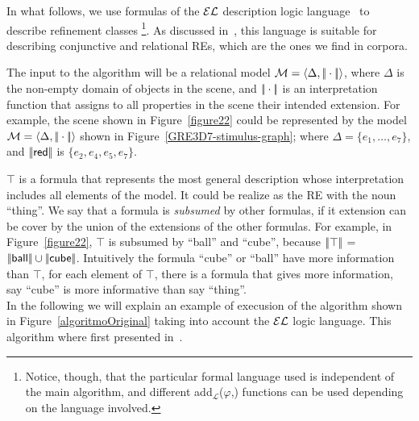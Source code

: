 
In what follows, we use formulas of the $\mathcal{EL}$ description logic
language~\cite{baad:desc03} to describe refinement classes
\footnote{Notice, though, that the particular formal language used is
  independent of the main algorithm, and different
  add$_{\mathcal{L}}$($\varphi$,\RE) functions can be used depending
  on the language involved.}.  As discussed
in~\cite{arec2:2008:Areces}, this language is suitable for describing
conjunctive and relational REs, which are the ones we find in corpora.

 The input to the algorithm will be a relational model $\mathcal{M} =
 \langle \Delta, |\!|\cdot|\!| \rangle$, where $\Delta$ is the non-empty domain
 of objects in the scene, and $|\!|\cdot|\!|$ is an interpretation
 function that assigns to all properties in the scene their intended
 extension.  For example, the scene shown in Figure~\ref{figure22}
 could be represented by the model $\mathcal{M}=\langle \Delta,|\!|\cdot|\!| \rangle$
 shown in Figure~\ref{GRE3D7-stimulus-graph}; where $\Delta =
 \{e_1,\ldots,e_7\}$, and $|\!|\textsf{red}|\!|$ is $\{e_2, e_4, e_5,
 e_7\}$.

$\top$ is a formula that represents the most general description whose
interpretation includes all elements of the model. It could be realize
as the RE with the noun ``\textsf{thing}''. We say that a formula is
\emph{subsumed} by other formulas, if it extension can be cover by the
union of the extensions of the other formulas. For example, in
Figure~\ref{figure22}, $\top$ is subsumed by ``\textsf{ball}'' and
``\textsf{cube}'', because $|\!|\top|\!|$ = $|\!|\textsf{ball}|\!|
\cup |\!|\textsf{cube}|\!|$.
Intuitively the formula ``\textsf{cube}'' or ``\textsf{ball}'' have more information than $\top$, for each element of $\top$, there is a formula that gives more information, say ``\textsf{cube}'' is more informative than say ``\textsf{thing}''.\\

In the following we will explain an example of execusion of the
algorithm shown in Figure~\ref{algoritmoOriginal} taking into account
the $\mathcal{EL}$ logic language. This algorithm where first presented
in~\cite{arec2:2008:Areces}.

